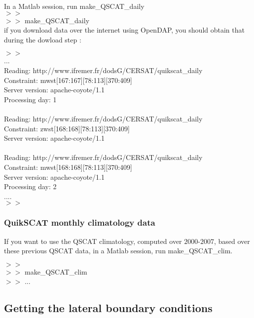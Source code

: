 \noindent In a Matlab session, run make\_QSCAT\_daily  \\
$>>$ \\
$>>$ make\_QSCAT\_daily \\

\noindent if you download data over the internet using OpenDAP, you should obtain that during
the dowload step : 

\noindent $>>$ \\ 
...\\ 
Reading: http://www.ifremer.fr/dodsG/CERSAT/quikscat\_daily\\
  Constraint: mwst[167:167][78:113][370:409]\\
Server version: apache-coyote/1.1\\
    Processing day: 1\\
\\
Reading: http://www.ifremer.fr/dodsG/CERSAT/quikscat\_daily\\
  Constraint: zwst[168:168][78:113][370:409]\\
Server version: apache-coyote/1.1\\
\\
Reading: http://www.ifremer.fr/dodsG/CERSAT/quikscat\_daily\\
  Constraint: mwst[168:168][78:113][370:409]\\
Server version: apache-coyote/1.1\\
    Processing day: 2\\
....\\
$>>$\\ 
\subsubsection{QuikSCAT monthly climatology data}
\label{sec:quikscat-daily-data}
\noindent If you want to use the QSCAT climatology, computed over $2000$-$2007$, based over
these previous QSCAT data, in a Matlab session, run make\_QSCAT\_clim.

\noindent $>>$ \\
$>>$ make\_QSCAT\_clim \\
$>>$ ...\\

\subsection{Getting the lateral boundary conditions}

